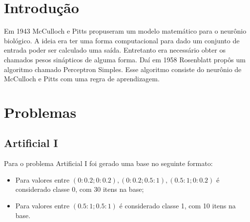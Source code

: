 \renewcommand{\figurename}{Figura}

\section{Introdução}

Em 1943 McCulloch e Pitts propuseram um modelo matemático para o
neurônio biológico. A ideia era ter uma forma computacional para dado um
conjunto de entrada poder ser calculado uma saída. Entretanto era
necessário obter os chamados pesos sinápticos de alguma forma. Daí em
1958 Rosenblatt propôs um algoritmo chamado Perceptron Simples. Esse
algoritmo consiste do neurônio de McCulloch e Pitts com uma regra de
aprendizagem.

\section{Problemas}

\subsection{Artificial I}

Para o problema Artificial I foi gerado uma base no seguinte formato:

\begin{itemize}
\tightlist
\item
  Para valores entre
  \((0 : 0.2; 0 : 0.2), (0 : 0.2; 0.5 : 1), (0.5 : 1; 0 : 0.2)\) é
  considerado classe 0, com 30 itens na base;
\item
  Para valores entre \((0.5 : 1; 0.5 : 1)\) é considerado classe 1, com
  10 itens na base.
\end{itemize}

\begin{Shaded}
\end{Shaded}

